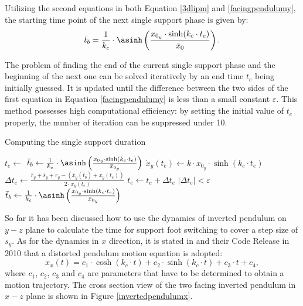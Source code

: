 Utilizing the second equations in both Equation {\ref{3dlipm}} and {\ref{facingpendulumy}}, the starting time point of the next single support phase is given by:
\begin{equation}
\bar{t}_b = \frac{1}{k_c}\cdot\asinh\left(\frac{x_{0_y}\cdot\sinh(k_c\cdot t_e)}{{\bar{x}}_0}\right).
\end{equation} 

The problem of finding the end of the current single support phase and the beginning of the next one can be solved iteratively by an end time $ t_e $ being initially guessed. It is updated until the difference between the two sides of the first equation in Equation {\ref{facingpendulumy}} is less than a small constant $ \varepsilon $. This method possesses high computational efficiency: by setting the initial value of $ t_e $ properly, the number of iteration can be suppressed under 10.

\begin{algorithm}[H]  
	\label{computefootswitchtime}
	\caption{Computing the single support duration}
	\begin{algorithmic}[1]
		\STATE  $ t_e \gets$ 
		\REPEAT 
		\STATE	$ \bar{t}_b \gets \frac{1}{k_c}\cdot\asinh\left(\frac{{x_0}_y\cdot\sinh(k_c\cdot t_e)}{\bar{x}_{0_y}} \right) $
		\STATE $ \dot{x}_y(t_e)\gets k\cdot x_{0_y}\cdot\sinh(k_c\cdot t_e) $
		\STATE $ \Delta t_e \gets \frac{\bar{r}_y+\bar{s}_y+r_y-\left(\bar{x}_y(\bar{t}_b)+x_y(t_e)\right)}{2\cdot\dot{x}_y(t_e)} $
		\STATE $ t_e \gets t_e + \Delta t_e $
		\UNTIL $ |\Delta t_e| < \varepsilon$
		\STATE $ \bar{t}_b \gets \frac{1}{k_c}\cdot\asinh\left(\frac{x_{0_y}\cdot\sinh(k_c\cdot t_e)}{\bar{x}_{0_y}}\right) $
	\end{algorithmic}  
\end{algorithm}

So far it has been discussed how to use the dynamics of inverted pendulum on $ y-z $ plane to calculate the time for support foot switching to cover a step size of $ s_y $. As for the dynamics in $ x $ direction, it is stated in \cite{Humanoids-Graf-Roefer-10} and their Code Release \cite{BHumanCodeRelease2010} in 2010 that a distorted pendulum motion equation is adopted:
\begin{equation}
\label{distortedpendulum}
x_x(t)=c_1\cdot\cosh(k_c\cdot t)+c_2\cdot\sinh(k_c\cdot t)+c_3\cdot t + c_4,
\end{equation}
where $ c_1 $, $ c_2 $, $ c_3 $ and $ c_4 $ are parameters that have to be determined to obtain a motion trajectory. The cross section view of the two facing inverted pendulum in $ x-z $ plane is shown in Figure {\ref{invertedpendulumx}}.

